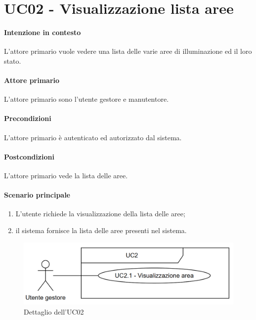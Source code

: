 \section{UC02 - Visualizzazione lista aree}\label{uc:02}

\paragraph{Intenzione in contesto} L'attore primario vuole vedere una lista delle varie aree di illuminazione ed il loro stato.

\paragraph{Attore primario} L'attore primario sono l'utente gestore e manutentore.

\paragraph{Precondizioni} L'attore primario è autenticato ed autorizzato dal sistema.

\paragraph{Postcondizioni} L'attore primario vede la lista delle aree.

\paragraph{Scenario principale}

\begin{enumerate}
    \item L'utente richiede la visualizzazione della lista delle aree;
    \item il sistema fornisce la lista delle aree presenti nel sistema.
\end{enumerate}

\begin{figure}[h]
    \includegraphics[width=\textwidth]{contenuti/img/casi_uso_grafici-uc2.png}
    \caption{Dettaglio dell'UC02}
    \label{fig:uc02}
\end{figure}

